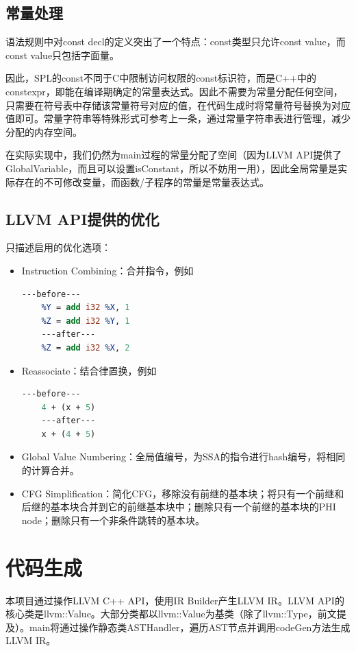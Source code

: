 \documentclass{article}
\begin{document}
\subsection{常量处理}
\par 语法规则中对const decl的定义突出了一个特点：const类型只允许const value，而const value只包括字面量。
\par 因此，SPL的const不同于C中限制访问权限的const标识符，而是C++中的constexpr，即能在编译期确定的常量表达式。因此不需要为常量分配任何空间，只需要在符号表中存储该常量符号对应的值，在代码生成时将常量符号替换为对应值即可。常量字符串等特殊形式可参考上一条，通过常量字符串表进行管理，减少分配的内存空间。
\par 在实际实现中，我们仍然为main过程的常量分配了空间（因为LLVM API提供了GlobalVariable，而且可以设置isConstant，所以不妨用一用），因此全局常量是实际存在的不可修改变量，而函数/子程序的常量是常量表达式。

\subsection{LLVM API提供的优化}
\par 只描述启用的优化选项：
\begin{itemize}
  \item Instruction Combining：合并指令，例如
  \begin{lstlisting}[language=LLVM]
    ---before---
    %Y = add i32 %X, 1
    %Z = add i32 %Y, 1
    ---after---
    %Z = add i32 %X, 2
  \end{lstlisting}
  \item Reassociate：结合律置换，例如
  \begin{lstlisting}[language=LLVM]
    ---before---
    4 + (x + 5)
    ---after---
    x + (4 + 5)
  \end{lstlisting}
  \item Global Value Numbering：全局值编号，为SSA的指令进行hash编号，将相同的计算合并。
  \item CFG Simplification：简化CFG，移除没有前继的基本块；将只有一个前继和后继的基本块合并到它的前继基本块中；删除只有一个前继的基本块的PHI node；删除只有一个非条件跳转的基本块。
\end{itemize}


\newpage
\section{代码生成}
\par 本项目通过操作LLVM C++ API，使用IR Builder产生LLVM IR。LLVM API的核心类是llvm::Value。大部分类都以llvm::Value为基类（除了llvm::Type，前文提及）。main将通过操作静态类ASTHandler，遍历AST节点并调用codeGen方法生成LLVM IR。
\end{document}
